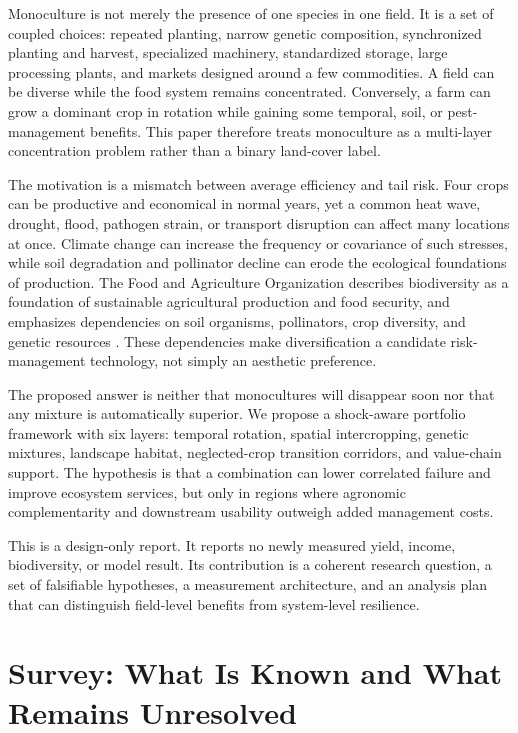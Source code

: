 \documentclass[conference]{IEEEtran}
\begin{document}
Monoculture is not merely the presence of one species in one field. It is a set of coupled choices: repeated planting, narrow genetic composition, synchronized planting and harvest, specialized machinery, standardized storage, large processing plants, and markets designed around a few commodities. A field can be diverse while the food system remains concentrated. Conversely, a farm can grow a dominant crop in rotation while gaining some temporal, soil, or pest-management benefits. This paper therefore treats monoculture as a multi-layer concentration problem rather than a binary land-cover label.

The motivation is a mismatch between average efficiency and tail risk. Four crops can be productive and economical in normal years, yet a common heat wave, drought, flood, pathogen strain, or transport disruption can affect many locations at once. Climate change can increase the frequency or covariance of such stresses, while soil degradation and pollinator decline can erode the ecological foundations of production. The Food and Agriculture Organization describes biodiversity as a foundation of sustainable agricultural production and food security, and emphasizes dependencies on soil organisms, pollinators, crop diversity, and genetic resources \cite{fao_biodiversity}. These dependencies make diversification a candidate risk-management technology, not simply an aesthetic preference.

The proposed answer is neither that monocultures will disappear soon nor that any mixture is automatically superior. We propose a shock-aware portfolio framework with six layers: temporal rotation, spatial intercropping, genetic mixtures, landscape habitat, neglected-crop transition corridors, and value-chain support. The hypothesis is that a combination can lower correlated failure and improve ecosystem services, but only in regions where agronomic complementarity and downstream usability outweigh added management costs.

This is a design-only report. It reports no newly measured yield, income, biodiversity, or model result. Its contribution is a coherent research question, a set of falsifiable hypotheses, a measurement architecture, and an analysis plan that can distinguish field-level benefits from system-level resilience.

\section{Survey: What Is Known and What Remains Unresolved}
\label{sec:survey}
\end{document}
